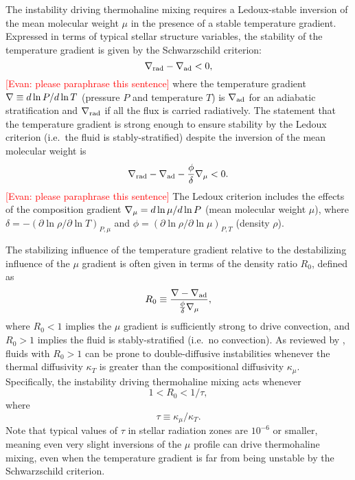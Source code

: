The instability driving thermohaline mixing requires a Ledoux-stable inversion of the mean molecular weight $\mu$ in the presence of a stable temperature gradient. 
Expressed in terms of typical stellar structure variables, the stability of the temperature gradient is given by the Schwarzschild criterion:
\begin{equation} \label{eq:Schwarzschild}
    \gradrad - \gradad < 0,
\end{equation}
\textcolor{red}{[Evan: please paraphrase this sentence]} where the temperature gradient $\nabla \equiv d \ln P / d \ln T$ (pressure $P$ and temperature $T$) is $\nabla_{\rm{ad}}$ for an adiabatic stratification and $\nabla_{\rm{rad}}$ if all the flux is carried radiatively. 
The statement that the temperature gradient is strong enough to ensure stability by the Ledoux criterion (i.e.~the fluid is stably-stratified) despite the inversion of the mean molecular weight is
\begin{equation} \label{eq:Ledoux}
    \gradrad - \gradad - \frac{\phi}{\delta}\gradmu < 0.
\end{equation}
\textcolor{red}{[Evan: please paraphrase this sentence]} The Ledoux criterion includes the effects of the composition gradient $\nabla_{\mu} = d\ln\mu/d\ln P$ (mean molecular weight $\mu$), where $\delta = -(\partial \ln \rho / \partial \ln T)_{P,\mu}$ and $\phi = (\partial \ln \rho / \partial \ln\mu)_{P,T}$ (density $\rho$).

The stabilizing influence of the temperature gradient relative to the destabilizing influence of the $\mu$ gradient is often given in terms of the density ratio $R_0$, defined as
\begin{equation} \label{eq:R0}
    R_0 \equiv \frac{\grad - \gradad}{\frac{\phi}{\delta} \gradmu},
\end{equation}
where $R_0 < 1$ implies the $\mu$ gradient is sufficiently strong to drive convection, and $R_0 > 1$ implies the fluid is stably-stratified (i.e.~no convection). 
As reviewed by \citet{garaud_DDC_review_2018}, fluids with $R_0 > 1$ can be prone to double-diffusive instabilities whenever the thermal diffusivity $\kappa_T$ is greater than the compositional diffusivity $\kappa_\mu$. Specifically, the instability driving thermohaline mixing acts whenever
\begin{equation} \label{eq:R0_condition}
1 < R_0 < 1/\tau,
\end{equation}
\citep{baines_gill_1969} where
\begin{equation} \label{eq:tau}
    \tau \equiv \kappa_\mu/\kappa_T.
\end{equation}
Note that typical values of $\tau$ in stellar radiation zones are $10^{-6}$ or smaller, meaning even very slight inversions of the $\mu$ profile can drive thermohaline mixing, even when the temperature gradient is far from being unstable by the Schwarzschild criterion.
